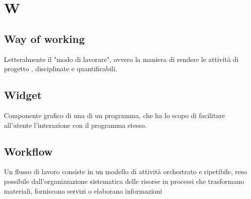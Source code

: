 \section*{W}
\markright{}

\subsection*{Way of working}
Letteralmente il "modo di lavorare", ovvero la maniera di rendere le attività di progetto , disciplinate e quantificabili.

\subsection*{Widget}
Componente grafico di una  di un programma, che ha lo scopo di facilitare all'utente l'interazione con il programma stesso.

\subsection*{Workflow}
Un flusso di lavoro consiste in un modello di attività orchestrato e ripetibile, reso possibile dall'organizzazione sistematica delle risorse in processi che trasformano materiali, forniscono servizi o elaborano informazioni